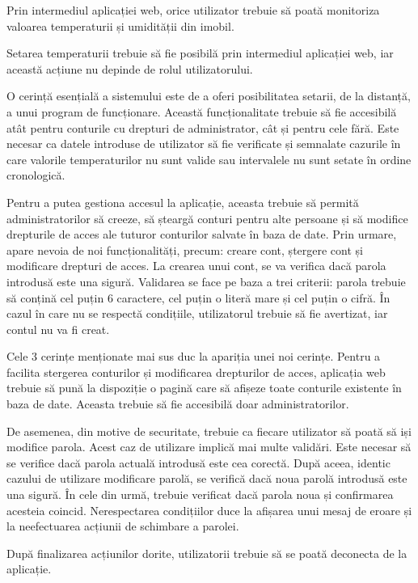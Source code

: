 	Prin intermediul aplicației web, orice utilizator trebuie să poată monitoriza valoarea temperaturii și umidității din imobil.

	Setarea temperaturii trebuie să fie posibilă prin intermediul aplicației web, iar această acțiune nu depinde de rolul utilizatorului.

	O cerință esențială a sistemului este de a oferi posibilitatea setarii, de la distanță, a unui program de funcționare. Această funcționalitate trebuie să fie accesibilă atât pentru conturile cu drepturi de administrator, cât și pentru cele fără. Este necesar ca datele introduse de utilizator să fie verificate și semnalate cazurile în care valorile temperaturilor nu sunt valide sau intervalele nu sunt setate în ordine cronologică.

	Pentru a putea gestiona accesul la aplicație, aceasta trebuie să permită administratorilor să creeze, să șteargă conturi pentru alte persoane și să modifice drepturile de acces ale tuturor conturilor salvate în baza de date. Prin urmare, apare nevoia de noi funcționalități, precum: creare cont, ștergere cont și modificare drepturi de acces. La crearea unui cont, se va verifica dacă parola introdusă este una sigură. Validarea se face pe baza a trei criterii: parola trebuie să conțină cel puțin 6 caractere, cel puțin o literă mare și cel puțin o cifră. În cazul în care nu se respectă condițiile, utilizatorul trebuie să fie avertizat, iar contul nu va fi creat. 

	Cele 3 cerințe menționate mai sus duc la apariția unei noi cerințe. Pentru a facilita stergerea conturilor și modificarea drepturilor de acces, aplicația web trebuie să pună la dispoziție o pagină care să afișeze toate conturile existente în baza de date. Aceasta trebuie să fie accesibilă doar administratorilor.
	 
	De asemenea, din motive de securitate, trebuie ca fiecare utilizator să poată să iși modifice parola. Acest caz de utilizare implică mai multe validări. Este necesar să se verifice dacă parola actuală introdusă este cea corectă. După aceea, identic cazului de utilizare modificare parolă, se verifică dacă noua parolă introdusă este una sigură. În cele din urmă, trebuie verificat dacă parola noua și confirmarea acesteia coincid. Nerespectarea condițiilor duce la afișarea unui mesaj de eroare și la neefectuarea acțiunii de schimbare a parolei.

	După finalizarea acțiunilor dorite, utilizatorii trebuie să se poată deconecta de la aplicație. 	 

